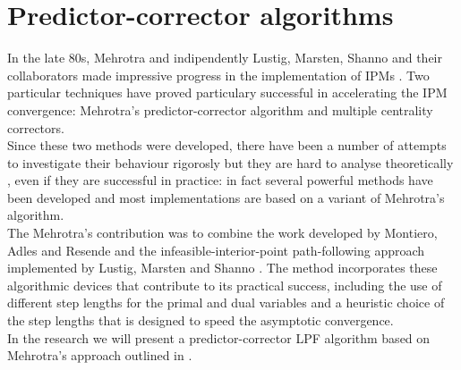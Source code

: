 \documentclass[a4paper,10 pt,titlepage,twoside]{book}
\theoremstyle{plain}
\theoremstyle{definition}
\theoremstyle{remark}
\begin{document}
\section{Predictor-corrector algorithms}\label{sec:pc}
In the late 80s, Mehrotra and indipendently Lustig, Marsten, Shanno and their collaborators made impressive progress in the implementation of IPMs \cite{Mehr}. Two particular techniques have proved particulary successful in accelerating the IPM convergence: Mehrotra's predictor-corrector algorithm and multiple centrality correctors. \\Since these two methods were developed, there have been a number of attempts to investigate their behaviour rigorosly but they are hard to analyse theoretically \cite{25y}, even if they are successful in practice: in fact several powerful methods have been developed and most implementations are based on a variant of Mehrotra's algorithm.\\
The Mehrotra's contribution was to combine the work developed by Montiero, Adles and Resende \cite{MARE} and the infeasible-interior-point path-following approach implemented by Lustig, Marsten and Shanno \cite{LMS}. 
The method incorporates these algorithmic devices that contribute to its practical success, including the use of different step lengths for the primal and dual variables and a heuristic choice of the step lengths that is designed to speed the asymptotic convergence.\\In the research we will present a predictor-corrector LPF algorithm based on Mehrotra's approach outlined in \cite{Wright}. 
\end{document}

